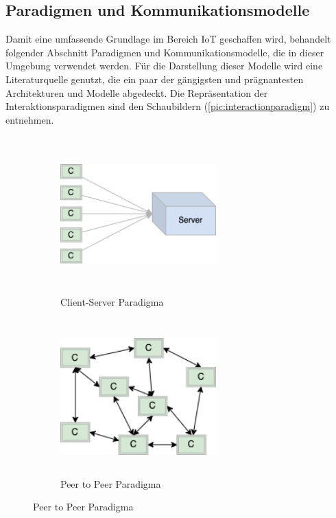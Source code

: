     \subsection{Paradigmen und Kommunikationsmodelle}
        Damit eine umfassende Grundlage im Bereich \acs{IoT} geschaffen wird, behandelt folgender Abschnitt Paradigmen und Kommunikationsmodelle, die 
        in dieser Umgebung verwendet werden. Für die Darstellung dieser Modelle wird eine Literaturquelle genutzt, die ein paar der gängigsten und 
        prägnantesten Architekturen und Modelle abgedeckt. Die Repräsentation der Interaktionsparadigmen sind den Schaubildern 
        (\ref{pic:interactionparadigm}) zu entnehmen. 
        \begin{figure}[hbt!]
            \centering
            \begin{subfigure}[b]{0.4\textwidth}
                \centering
                \includegraphics[width=6cm,height=6cm,keepaspectratio]{images/C-S.png}
                \caption{Client-Server Paradigma}
                \label{pic:cs}
            \end{subfigure}
            \begin{subfigure}[b]{0.4\textwidth}
                \centering
                \includegraphics[width=6cm,height=6cm,keepaspectratio]{images/PtoP.png}
                \caption{Peer to Peer Paradigma}
                \label{pic:pp}

\end{subfigure}
\end{figure}
